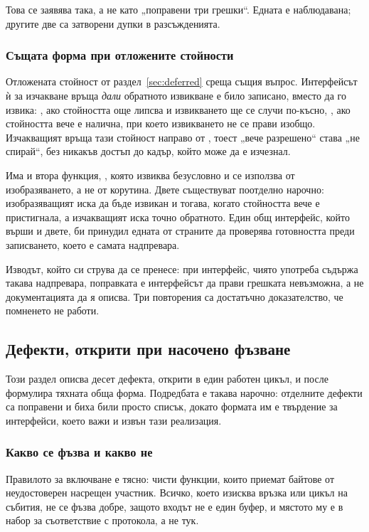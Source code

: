 Това се заявява така, а не като „поправени три грешки“. Едната е наблюдавана; другите две са
затворени дупки в разсъжденията.

\subsubsection{Същата форма при отложените стойности}

Отложената стойност от раздел~\ref{sec:deferred} среща същия въпрос. Интерфейсът ѝ за
изчакване връща \emph{дали} обратното извикване е било записано, вместо да го извика:
, ако стойността още липсва и извикването ще се случи по-късно, , ако
стойността вече е налична, при което извикването не се прави изобщо. Изчакващият връща тази
стойност направо от , тоест „вече разрешено“ става „не спирай“, без
никакъв достъп до кадър, който може да е изчезнал.

Има и втора функция, , която извиква безусловно и се използва от
изобразяването, а не от корутина. Двете съществуват поотделно нарочно: изобразяващият иска
да бъде извикан и тогава, когато стойността вече е пристигнала, а изчакващият иска точно
обратното. Един общ интерфейс, който върши и двете, би принудил едната от страните да
проверява готовността преди записването, което е самата надпревара.

Изводът, който си струва да се пренесе: при интерфейс, чиято употреба съдържа такава
надпревара, поправката е интерфейсът да прави грешката невъзможна, а не документацията да я
описва. Три повторения са достатъчно доказателство, че помненето не работи.

\subsection{Дефекти, открити при насочено фъзване}
\label{sec:fuzz}

Този раздел описва десет дефекта, открити в един работен цикъл, и после формулира тяхната
обща форма. Подредбата е такава нарочно: отделните дефекти са поправени и биха били просто
списък, докато формата им е твърдение за интерфейси, което важи и извън тази реализация.

\subsubsection{Какво се фъзва и какво не}

Правилото за включване е тясно: чисти функции, които приемат байтове от неудостоверен
насрещен участник. Всичко, което изисква връзка или цикъл на събития, не се фъзва добре,
защото входът не е един буфер, и мястото му е в набор за съответствие с протокола, а не тук.

